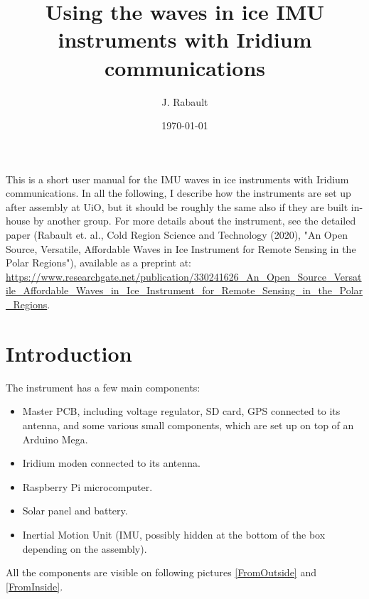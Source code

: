 \documentclass[pdftex,a4paper,12pt,twocolumn,fleqn,captions=tableheading]{scrartcl}
\begin{document}
\title{Using the waves in ice IMU instruments with Iridium communications}
\author{J. Rabault
  }
\date{\today}

\maketitle

This is a short user manual for the IMU waves in ice instruments with Iridium communications. In all the following, I describe how the instruments are set up after assembly at UiO, but it should be roughly the same also if they are built in-house by another group. For more details about the instrument, see the detailed paper (Rabault et. al., Cold Region Science and Technology (2020), "An Open Source, Versatile, Affordable Waves in Ice Instrument for Remote Sensing in the Polar Regions"), available as a preprint at: ~\\

\url{https://www.researchgate.net/publication/330241626_An_Open_Source_Versatile_Affordable_Waves_in_Ice_Instrument_for_Remote_Sensing_in_the_Polar_Regions}.

\section{Introduction}

The instrument has a few main components:

\begin{itemize}
  \item Master PCB, including voltage regulator, SD card, GPS connected to its antenna, and some various small components, which are set up on top of an Arduino Mega.
  \item Iridium moden connected to its antenna.
  \item Raspberry Pi microcomputer.
  \item Solar panel and battery.
  \item Inertial Motion Unit (IMU, possibly hidden at the bottom of the box depending on the assembly).
\end{itemize}

All the components are visible on following pictures \ref{FromOutside} and \ref{FromInside}.
\end{document}
